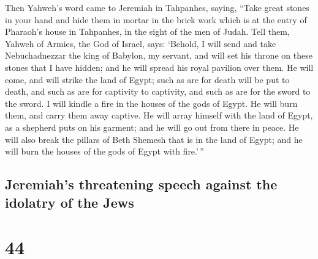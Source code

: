  Then Yahweh's word came to Jeremiah in Tahpanhes, saying,
 ``Take great stones in your hand and hide them in mortar
in the brick work which is at the entry of Pharaoh's house in Tahpanhes,
in the sight of the men of Judah.  Tell them, Yahweh of
Armies, the God of Israel, says: `Behold, I will send and take
Nebuchadnezzar the king of Babylon, my servant, and will set his throne
on these stones that I have hidden; and he will spread his royal
pavilion over them.  He will come, and will strike the
land of Egypt; such as are for death will be put to death, and such as
are for captivity to captivity, and such as are for the sword to the
sword.  I will kindle a fire in the houses of the gods of
Egypt. He will burn them, and carry them away captive. He will array
himself with the land of Egypt, as a shepherd puts on his garment; and
he will go out from there in peace.  He will also break
the pillars of Beth Shemesh that is in the land of Egypt; and he will
burn the houses of the gods of Egypt with fire.'\,''

\hypertarget{jeremiahs-threatening-speech-against-the-idolatry-of-the-jews}{%
\subsection{Jeremiah's threatening speech against the idolatry of the
Jews}\label{jeremiahs-threatening-speech-against-the-idolatry-of-the-jews}}

\hypertarget{section-43}{%
\section{44}\label{section-43}}

